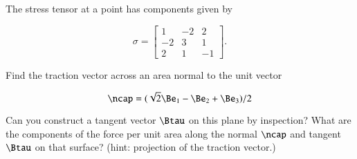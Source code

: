 \begin{Exercise}[title={Traction vector}, label={problem:continuumProblemSet1:q3}]
The stress tensor at a point has components given by

\begin{equation}\label{eqn:continuumProblemSet1:50}
\sigma =
\begin{bmatrix}
1 & -2 & 2 \\
-2 & 3 & 1 \\
2 & 1 & -1
\end{bmatrix}.
\end{equation}

Find the traction vector across an area normal to the unit vector

\begin{equation}\label{eqn:continuumProblemSet1:70}
\ncap = ( \sqrt{2} \Be_1 - \Be_2 + \Be_3)/2
\end{equation}

Can you construct a tangent vector $\Btau$ on this plane by inspection?  What are the components of the force per unit area along the normal $\ncap$ and tangent $\Btau$ on that surface?  (hint: projection of the traction vector.)
\end{Exercise}

